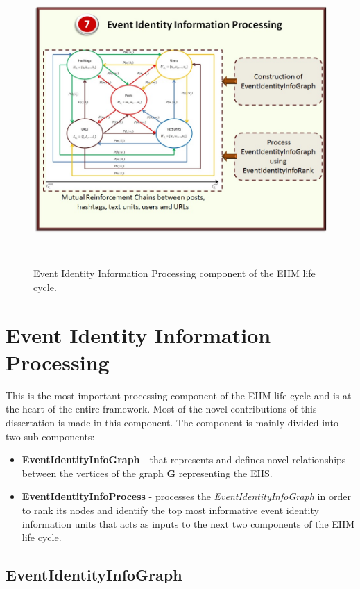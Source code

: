 \begin{figure}[htbp]
  \caption{Event Identity Information Processing component of the EIIM life cycle.}
  \centering
    \includegraphics[width=14cm,height=11cm]{Figures/EIIMComponents/EventIdentityInformationProcessing.jpg}
\end{figure}

\section{Event Identity Information Processing\label{EventIdentityInformationProcessing}}
This is the most important processing component of the EIIM life cycle and is at the heart of the entire framework. Most of the novel contributions of this dissertation is made in this component. The component is mainly divided into two sub-components:
\begin{itemize}
\item \textbf{EventIdentityInfoGraph} - that represents and defines novel relationships between the vertices of the graph $\mathbf{G}$ representing the EIIS.
\item \textbf{EventIdentityInfoProcess} - processes the \textit{EventIdentityInfoGraph} in order to rank its nodes and identify the top most informative event identity information units that acts as inputs to the next two components of the EIIM life cycle.
\end{itemize}

\subsection{EventIdentityInfoGraph\label{eventidentityinfograph}}

